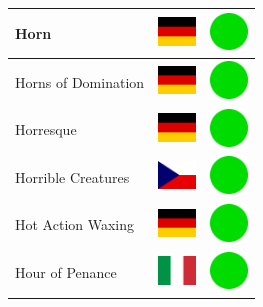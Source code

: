 \documentclass[12pt, a4paper, twoside]{report}
\begin{document}
\begin{center}
\begin{longtable}{|p{5cm}|p{2cm}|p{2cm}|}
 Horn                                                       & \includegraphics[width=1cm]{../4x3/de} &   \includegraphics[width=1cm]{../likes/y} \\ \hline
 Horns of Domination                                        & \includegraphics[width=1cm]{../4x3/de} &   \includegraphics[width=1cm]{../likes/y} \\ \hline
 Horresque                                                  & \includegraphics[width=1cm]{../4x3/de} &   \includegraphics[width=1cm]{../likes/y} \\ \hline
 Horrible Creatures                                         & \includegraphics[width=1cm]{../4x3/cz} &   \includegraphics[width=1cm]{../likes/y} \\ \hline
 Hot Action Waxing                                          & \includegraphics[width=1cm]{../4x3/de} &   \includegraphics[width=1cm]{../likes/y} \\ \hline
 Hour of Penance                                            & \includegraphics[width=1cm]{../4x3/it} &   \includegraphics[width=1cm]{../likes/y} \\ \hline

\end{longtable}
\end{center}
\end{document}
